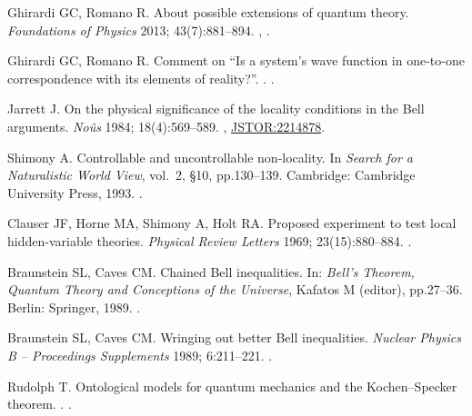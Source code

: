 \documentclass[DIV=calc,paper=a4,fontsize=11pt,twocolumn]{scrartcl} %
\theoremstyle{definition}
\theoremstyle{plain}
\begin{document}
\begin{thebibliography}{10}
Ghirardi GC, Romano R.
\newblock About possible extensions of quantum theory.
\newblock \emph{Foundations of Physics} 2013; 43(7):881--894.
\newblock \href {http://arxiv.org/abs/1301.5040} {},
\href {http://dx.doi.org/10.1007/s10701-013-9724-6}
{}.

Ghirardi GC, Romano R.
\newblock Comment on ``Is a system's wave function in one-to-one correspondence with its elements of reality?''.
.
\newblock \href {http://arxiv.org/abs/1302.1635} {}.

Jarrett J.
\newblock On the physical significance of the locality conditions in the {B}ell
arguments.
\newblock \emph{No{\^u}s} 1984; 18(4):569--589.
\newblock \href {http://dx.doi.org/10.2307/2214878}{},
\newblock \href{http://www.jstor.org/stable/2214878}{JSTOR:2214878}.

Shimony A.
\newblock Controllable and uncontrollable non-locality.
\newblock In \emph{{Search for a Naturalistic World View}}, vol.~2,
\S 10, pp.130--139. Cambridge: Cambridge University Press, 1993.
\newblock \href {http://dx.doi.org/10.1017/CBO9781139172196.010}{}.

Clauser JF, Horne MA, Shimony A, Holt RA.
\newblock Proposed experiment to test local hidden-variable theories.
\newblock \emph{Physical Review Letters} 1969; 23(15):880--884.
\newblock \href {http://dx.doi.org/10.1103/PhysRevLett.23.880}
{}.

Braunstein SL, Caves CM.
\newblock Chained Bell inequalities.
\newblock In: \emph{Bell's Theorem, Quantum Theory and Conceptions of the Universe}, Kafatos M (editor), pp.27--36. Berlin: Springer, 1989.
\newblock \href {http://dx.doi.org/10.1007/978-94-017-0849-4_5}
{}.

Braunstein SL, Caves CM.
\newblock Wringing out better Bell inequalities.
\newblock \emph{Nuclear Physics B -- Proceedings Supplements} 1989; 6:211--221.
\newblock \href{http://dx.doi.org/10.1016/0920-5632(89)90441-6}{}.

Rudolph T.
\newblock Ontological models for quantum mechanics and the Kochen--Specker theorem.
.
\newblock \href {http://arxiv.org/abs/quant-ph/0608120}
{}.


\end{thebibliography}
\end{document}
